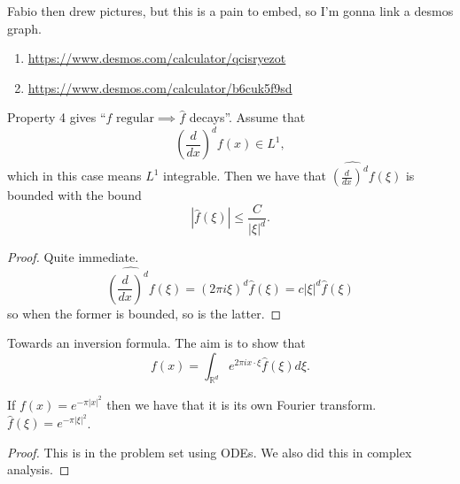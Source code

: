 Fabio then drew pictures, but this is a pain to embed, so I'm gonna link a desmos graph.

\begin{example}\leavevmode
\begin{enumerate}

	\item \url{https://www.desmos.com/calculator/qcisryezot}
	\item \url{https://www.desmos.com/calculator/b6cuk5f9sd}

\end{enumerate}
	
\end{example}

\begin{proposition}
	Property 4 gives ``\( f \text{ regular} \implies \hat f \) decays''.
	Assume that
	\[ \left( \frac{d}{dx} \right)^{d} f(x) \in L^{1}, \]
	which in this case means \( L^{1} \) integrable. Then we have that
	\( \widehat{\left( \frac{d}{dx} \right)^{d}f}(\xi) \)
	is bounded with the bound
	\[ \left| \hat f( \xi) \right| \le \frac{C}{| \xi|^{d}}. \]
\end{proposition}
\begin{proof}
	Quite immediate.
	\[ \widehat{\left( \frac{d}{dx} \right)^{d}f}(\xi) = \left( 2 \pi i \xi \right)^{d} \hat f ( \xi) = c | \xi|^{d} \hat f( \xi) \]
	so when the former is bounded, so is the latter.
\end{proof}

Towards an inversion formula. The aim is to show that
\[ f(x) = \int_{\mathbb{R}^{d}} e^{2 \pi i x \cdot \xi} \hat f( \xi) d \xi. \]
\begin{lemma}
	If \( f(x) = e^{- \pi |x|^{2}} \) then we have that it is its own Fourier transform. \( \hat f( \xi) = e^{- \pi | \xi|^{2}} \).
\end{lemma}
\begin{proof}
	This is in the problem set using ODEs. We also did this in complex analysis.
\end{proof}

